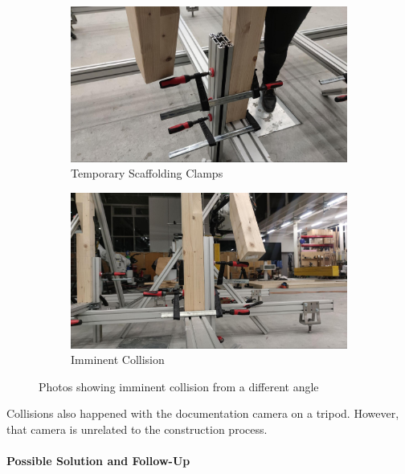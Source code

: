 \begin{figure}[!h]
    \centering
    \begin{subfigure}[b]{0.49\textwidth}
        \centering
        \includegraphics[width=\textwidth]{images/6b/img14.jpg}
        \caption{Temporary Scaffolding Clamps}
    \end{subfigure}
    \hfill
    \begin{subfigure}[b]{0.49\textwidth}
        \centering
        \includegraphics[width=\textwidth]{images/6b/img15.jpg}
        \caption{Imminent Collision}
    \end{subfigure}
    \caption{Photos showing imminent collision from a different angle}
\end{figure}


Collisions also happened with the documentation camera on a tripod. However, that camera is unrelated to the construction process.

\paragraph{Possible Solution and Follow-Up}

